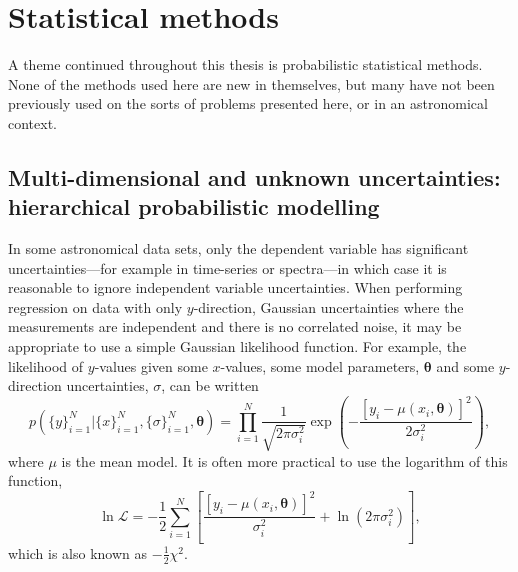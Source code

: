 \section{Statistical methods}

A theme continued throughout this thesis is probabilistic statistical methods.
None of the methods used here are new in themselves, but many have not been
previously used on the sorts of problems presented here, or in an astronomical
context.

\subsection{Multi-dimensional and unknown uncertainties: hierarchical
probabilistic modelling}
In some astronomical data sets, only the dependent variable has significant
uncertainties---for example in time-series or spectra---in which case it is
reasonable to ignore independent variable uncertainties.
When performing regression on data with only $y$-direction, Gaussian
uncertainties where the measurements are independent and there is no
correlated noise, it may be appropriate to use a simple Gaussian likelihood
function.
For example, the likelihood of $y$-values given some $x$-values, some model
parameters, $\mathbf{\theta}$ and some $y$-direction uncertainties, $\sigma$,
can be written
\begin{equation}
    p(\{y\}_{i=1}^N|\{x\}_{i=1}^N, \{\sigma\}_{i=1}^N, \mathbf{\theta})
    = \prod_{i=1}^N \frac{1}{\sqrt{2\pi\sigma_i^2}}
    \exp\left(-\frac{[y_i - \mu(x_i, \mathbf{\theta})]^2}{2\sigma_i^2}\right),
\end{equation}
where $\mu$ is the mean model.
It is often more practical to use the logarithm of this function,
\begin{equation}
    \ln\mathcal{L} =
    -\frac{1}{2} \sum_{i=1}^N \left[\frac{[y_i - \mu(x_i,
    \mathbf{\theta})]^2}{\sigma_i^2} +
    \ln\left(2\pi\sigma_i^2\right) \right],
\end{equation}
\label{eq:lnlike_intro}
which is also known as $-\frac{1}{2}\chi^2$.


